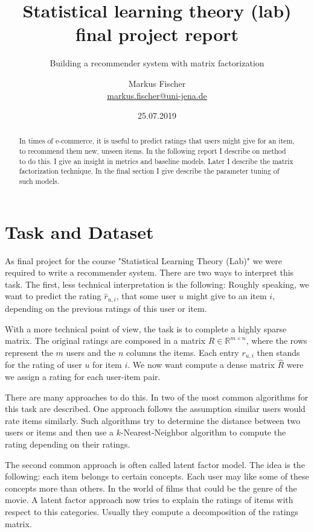 \documentclass[DIV=14,twocolumn]{scrartcl}
\title{Statistical learning theory (lab) final project report}
\subtitle{Building a recommender system with matrix factorization}
\author{Markus Fischer\\ \small{\href{mailto:markus.fischer@uni-jena.de}{markus.fischer@uni-jena.de}}}
\date{25.07.2019}
\begin{document}
\maketitle
\begin{abstract}
In times of e-commerce, it is useful to predict ratings that  users might give for an item, to recommend them new, unseen items. In the following report I describe on method to do this. I give an insight in metrics and baseline models. Later I describe the matrix factorization technique. In the final section I give describe the parameter tuning of such models.
\end{abstract}

\section{Task and Dataset}\label{intro}
As final project for the course "Statistical Learning Theory (Lab)" we were required to write a recommender system. There are two ways to interpret this task.
The first, less technical interpretation is the following: Roughly speaking, we want to predict the rating $\hat{r}_{u,i}$, that some user $u$ might give to an item $i$, depending on the previous ratings of this user or item.

With a more technical point of view, the task is to complete a highly sparse matrix. The original ratings are composed in a matrix $R\in\mathbb{R}^{m\times n}$, where the rows represent the $m$ users and the $n$ columns the items.
Each entry $r_{u,i}$ then stands for the rating of user $u$ for item $i$. We now want compute a dense matrix $\hat{R}$ were we assign a rating for each user-item pair.

There are many approaches to do this. In \cite{KoBeVo09} two of the most common algorithms for this task are described.
One approach follows the assumption similar users would rate items similarly. Such algorithms try to determine the distance between two users or items and then use a $k$-Nearest-Neighbor algorithm to compute the rating depending on their ratings.

The second common approach is often called latent factor model. The idea is the following: each item belongs to certain concepts. Each user may like some of these concepts more than others. In the world of films that could be the genre of the movie. A latent factor approach now tries to explain the ratings of items with respect to this categories. Usually they compute a decomposition of the ratings matrix.
\end{document}
